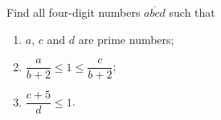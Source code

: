 Find all four-digit numbers $\overline{abcd}$ such that
\begin{enumerate}
\item[(i)] $a$, $c$ and $d$ are prime numbers;
\item[(ii)] $\dfrac{a}{b+2}\le1\le\dfrac{c}{b+2}$;
\item[(iii)] $\dfrac{c+5}{d}\le1$.
\end{enumerate}
